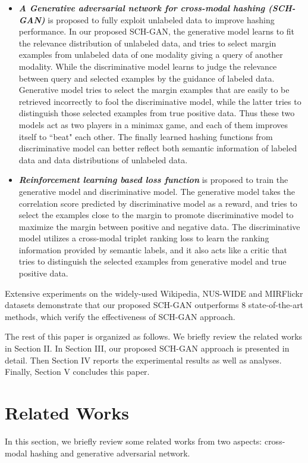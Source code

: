 \documentclass[journal]{IEEEtran}
\begin{document}
\begin{itemize}
	\item \textbf{\textit{A Generative adversarial network for cross-modal hashing (SCH-GAN)}} is proposed to fully exploit unlabeled data to improve hashing performance. In our proposed SCH-GAN, the generative model learns to fit the relevance distribution of unlabeled data, and tries to select margin examples from unlabeled data of one modality giving a query of another modality. While the discriminative model learns to judge the relevance between query and selected examples by the guidance of labeled data. Generative model tries to select the margin examples that are easily to be retrieved incorrectly to fool the discriminative model, while the latter tries to distinguish those selected examples from true positive data. Thus these two models act as two players in a minimax game, and each of them improves itself to ``beat" each other. The finally learned hashing functions from discriminative model can better reflect both semantic information of labeled data and data distributions of unlabeled data.
	\item \textbf{\textit{Reinforcement learning based loss function}} is proposed to train the generative model and discriminative model. The generative model takes the correlation score predicted by discriminative model as a reward, and tries to select the examples close to the margin to promote discriminative model to maximize the margin between positive and negative data. The discriminative model utilizes a cross-modal triplet ranking loss to learn the ranking information provided by semantic labels, and it also acts like a critic that tries to distinguish the selected examples from generative model and true positive data.
\end{itemize}

Extensive experiments on the widely-used Wikipedia, NUS-WIDE and MIRFlickr datasets demonstrate that our proposed SCH-GAN outperforms 8 state-of-the-art methods, which verify the effectiveness of SCH-GAN approach.

The rest of this paper is organized as follows. We briefly review the related works in Section II. In Section III, our proposed SCH-GAN approach is presented in detail. Then Section IV reports the experimental results as well as analyses. Finally, Section V concludes this paper.

\section{Related Works}
In this section, we briefly review some related works from two aspects: cross-modal hashing and generative adversarial network.
\end{document}

